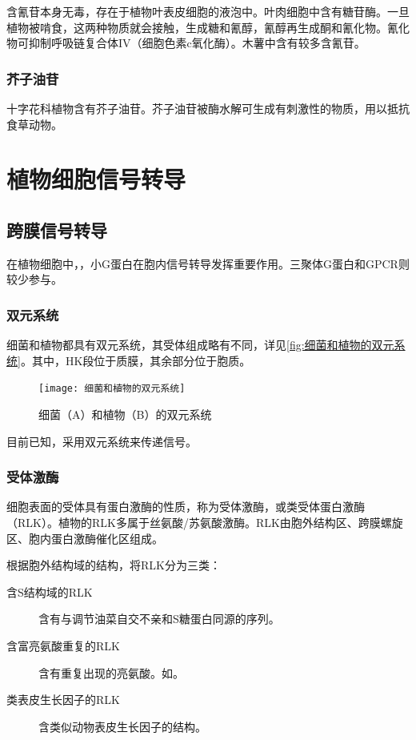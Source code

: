 含氰苷本身无毒，存在于植物叶表皮细胞的液泡中。叶肉细胞中含有糖苷酶。一旦植物被啃食，这两种物质就会接触，生成糖和氰醇，氰醇再生成酮和氰化物。氰化物可抑制呼吸链复合体IV（细胞色素c氧化酶）。木薯中含有较多含氰苷。

\subsubsection{芥子油苷}

十字花科植物含有芥子油苷。芥子油苷被酶水解可生成有刺激性的物质，用以抵抗食草动物。

\section{植物细胞信号转导}

\subsection{跨膜信号转导}

在植物细胞中，，小G蛋白在胞内信号转导发挥重要作用。三聚体G蛋白和GPCR则较少参与。

\subsubsection{双元系统}

细菌和植物都具有双元系统，其受体组成略有不同，详见\autoref{fig:细菌和植物的双元系统}。其中，HK段位于质膜，其余部分位于胞质。

\begin{figure}[htbp]
	\centering
	\texttt{[image: 细菌和植物的双元系统]}
	\caption{细菌（A）和植物（B）的双元系统}
	\label{fig:细菌和植物的双元系统}
\end{figure}

目前已知，采用双元系统来传递信号。

\subsubsection{受体激酶}

细胞表面的受体具有蛋白激酶的性质，称为受体激酶，或类受体蛋白激酶（RLK）。植物的RLK多属于丝氨酸/苏氨酸激酶。RLK由胞外结构区、跨膜螺旋区、胞内蛋白激酶催化区组成。

根据胞外结构域的结构，将RLK分为三类：

\begin{description}
	\item[含S结构域的RLK] 含有与调节油菜自交不亲和S糖蛋白同源的序列。
	\item[含富亮氨酸重复的RLK] 含有重复出现的亮氨酸。如。
	\item[类表皮生长因子的RLK] 含类似动物表皮生长因子的结构。
\end{description}

